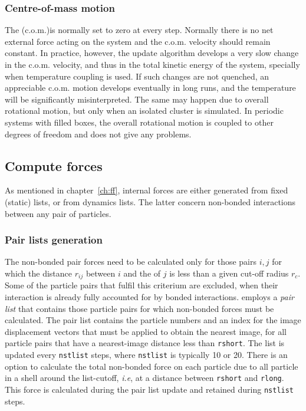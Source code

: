 \subsubsection*{Centre-of-mass motion}
The  (c.o.m.)is normally set to zero at every step. 
Normally there is no net external force acting on the system and the c.o.m.
velocity should remain constant. In practice, however, the update
algorithm develops a very slow change in the c.o.m. velocity, and thus
in the total kinetic energy of the system, 
specially when temperature coupling is used. If such changes are not
quenched, an appreciable c.o.m. motion develops eventually in long
runs, and the temperature will be significantly misinterpreted. The
same may happen due to overall rotational motion, but only when an
isolated cluster is simulated. In periodic systems with filled boxes,
the overall rotational motion is coupled to other degrees of freedom
and does not give any problems.

\subsection{Compute forces}
\label{subsec:forces}
As mentioned in chapter~\ref{ch:ff}, internal forces are
either generated from fixed (static) lists, or from dynamics lists.
The latter concern non-bonded interactions between any pair of particles.

\subsubsection{Pair lists generation}
The non-bonded pair forces need to be calculated only for those pairs
$i,j$  for which the distance $r_{ij}$ between $i$ and the 
of  $j$ is less than a given cut-off radius $r_c$. Some of the
particle pairs that fulfil this criterium are excluded, when their
interaction is already fully accounted for by bonded interactions. {\gromacs}
employs  a {\em pair list} that contains 
those  particle pairs for which non-bonded forces must be calculated.
The  pair list contains the particle numbers and an index for the image
displacement vectors that must be applied to  obtain the nearest
image, for  all particle pairs that
have a  nearest-image distance less than \verb'rshort'. The list is
updated  every \verb'nstlist' steps, where \verb'nstlist' is typically
10 or  20. There is an option to calculate the total non-bonded force
on each  particle due to all particle in a shell around the
list-cutoff, {\em  i.e}, at a distance between \verb'rshort' and
\verb'rlong'.  This force is calculated during the pair list update
and  retained during \verb'nstlist' steps.

